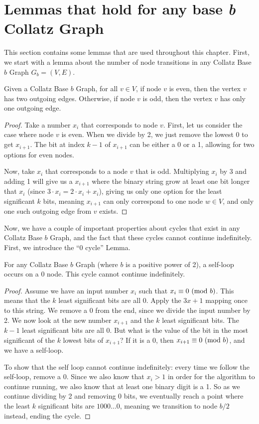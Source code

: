 \section{Lemmas that hold for any base \textit{b} Collatz Graph}
This section contains some lemmas that are used throughout this chapter. First, we start with a lemma about the number of node transitions in any Collatz Base $b$ Graph $G_b= (V,E)$.
\begin{lemma}
\label{lem:numOutEdges}
Given a Collatz Base $b$ Graph, for all $v \in V$, if node $v$ is even, then the vertex $v$ has two outgoing edges. Otherwise, if node $v$ is odd, then the vertex $v$ has only one outgoing edge.
\end{lemma}
\begin{proof}
Take a number $x_i$ that corresponds to node $v$. First, let us consider the case where node $v$ is even. When we divide by 2, we just remove the lowest 0 to get $x_{i+1}$. The bit at index $k-1$ of $x_{i+1}$ can be either a 0 or a 1, allowing for two options for even nodes. \par
Now, take $x_i$ that corresponds to a node $v$ that is odd. Multiplying $x_i$ by 3 and adding 1 will give us a $x_{i+1}$ where the binary string grow at least one bit longer that $x_i$ (since $3\cdot x_i = 2 \cdot x_i + x_i$), giving us only one option for the least significant $k$ bits, meaning $x_{i+1}$ can only correspond to one node $w \in V$, and only one such outgoing edge from $v$ exists.
\end{proof}
Now, we have a couple of important properties about cycles that exist in any Collatz Base $b$ Graph, and the fact that these cycles cannot continue indefinitely. First, we introduce the ``0 cycle'' Lemma.
\begin{lemma}
\label{lem:zeroCycle}
For any Collatz Base $b$ Graph (where $b$ is a positive power of 2), a self-loop occurs on a 0 node. This cycle cannot continue indefinitely.
\end{lemma}
\begin{proof}
Assume we have an input number $x_i$ such that $x_i \equiv 0 \ (\mathrm{mod}\ b)$. This means that the $k$ least significant bits are all 0. Apply the $3x+1$ mapping once to this string. We remove a 0 from the end, since we divide the input number by 2. We now look at the new number $x_{i+1}$ and the $k$ least significant bits. The $k-1$ least significant bits are all 0. But what is the value of the bit in the most significant of the $k$ lowest bits of $x_{i+1}$? If it is a 0, then $x_{i+1} \equiv 0 \ (\mathrm{mod}\ b)$, and we have a self-loop. \par
To show that the self loop cannot continue indefinitely: every time we follow the self-loop, remove a 0. Since we also know that $x_i > 1$ in order for the algorithm to continue running, we also know that at least one binary digit is a 1. So as we continue dividing by 2 and removing 0 bits, we eventually reach a point where the least $k$ significant bits are $1000\ldots 0$, meaning we transition to node $b/2$ instead, ending the cycle.
\end{proof}
